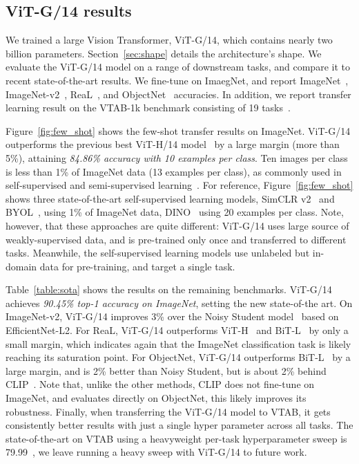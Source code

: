 \subsection{ViT-G/14 results}\label{sec:results}

We trained a large Vision Transformer, ViT-G/14, which contains nearly two billion parameters.
Section~\ref{sec:shape} details the architecture's shape.
We evaluate the ViT-G/14 model on a range of downstream tasks, and compare it to recent state-of-the-art results.
We fine-tune on ImaegNet, and report ImageNet~\cite{ILSVRC15}, ImageNet-v2~\cite{recht2019imagenet}, ReaL~\cite{beyer2020imagenet}, and ObjectNet~\cite{Barbu2019ObjectNetAL} accuracies. 
In addition, we report transfer learning result on the VTAB-1k benchmark consisting of 19 tasks~\cite{zhai2019largescale}. 

Figure~\ref{fig:few_shot} shows the few-shot transfer results on ImageNet.
ViT-G/14 outperforms the previous best ViT-H/14 model~\cite{dosovitskiy2020} by a large margin (more than 5\%), attaining \emph{84.86\% accuracy with 10 examples per class}.
Ten images per class is less than 1\% of ImageNet data (13 examples per class), as commonly used in self-supervised and semi-supervised learning~\cite{zhai2019s4l}.
For reference, Figure~\ref{fig:few_shot} shows three state-of-the-art self-supervised learning models, SimCLR v2~\cite{chen2020big} and BYOL~\cite{grill2020bootstrap}, using 1\% of ImageNet data, DINO~\cite{dino} using 20 examples per class.
Note, however, that these approaches are quite different:
ViT-G/14 uses large source of weakly-supervised data, and is pre-trained only once and transferred to different tasks.
Meanwhile, the self-supervised learning models use unlabeled but in-domain data for pre-training, and target a single task.

Table~\ref{table:sota} shows the results on the remaining benchmarks.
ViT-G/14 achieves \emph{90.45\% top-1 accuracy on ImageNet}, setting the new state-of-the art. 
On ImageNet-v2, ViT-G/14 improves 3\% over the Noisy Student model~\cite{xie2019selftraining} based on EfficientNet-L2. 
For ReaL, ViT-G/14 outperforms ViT-H~\cite{dosovitskiy2020} and BiT-L~\cite{kolesnikov2019big} by only a small margin, which indicates again that the ImageNet classification task is likely reaching its saturation point.
For ObjectNet, ViT-G/14 outperforms BiT-L~\cite{kolesnikov2019big} by a large margin, and is 2\% better than Noisy Student, but is about 2\% behind CLIP~\cite{radford2021learning}. 
Note that, unlike the other methods, CLIP does not fine-tune on ImageNet, and evaluates directly on ObjectNet, this likely improves its robustness.
Finally, when transferring the ViT-G/14 model to VTAB, it gets consistently better results with just a single hyper parameter across all tasks.
The state-of-the-art on VTAB using a heavyweight per-task hyperparameter sweep is 79.99~\cite{jia2021scaling}, we leave running a heavy sweep with ViT-G/14 to future work.

